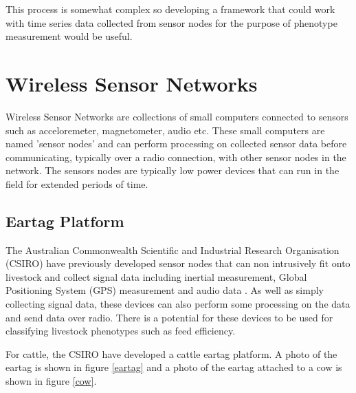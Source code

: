 This process is somewhat complex so developing a framework that could work with time series data collected from sensor nodes for the purpose of phenotype measurement would be useful. 

\section{Wireless Sensor Networks}
Wireless Sensor Networks are collections of small computers connected to sensors such as acceloremeter, magnetometer, audio etc. These small computers are named 'sensor nodes' and can perform processing on collected sensor data before communicating, typically over a radio connection, with other sensor nodes in the network.  The sensors nodes are typically low power devices that can run in the field for extended periods of time. \cite{lewis2004wireless}

\subsection{Eartag Platform}
The Australian Commonwealth Scientific and Industrial Research Organisation (CSIRO) have previously developed sensor nodes that can non intrusively fit onto livestock and collect signal data including inertial measurement, Global Positioning System (GPS) measurement and audio data \cite{Guo2006}. As well as simply collecting signal data, these devices can also perform some processing on the data and send data over radio. There is a potential for these devices to be used for classifying livestock phenotypes such as feed efficiency.

For cattle, the CSIRO have developed a cattle eartag platform. A photo of the eartag is shown in figure \ref{eartag} and a photo of the eartag attached to a cow is shown in figure \ref{cow}.

